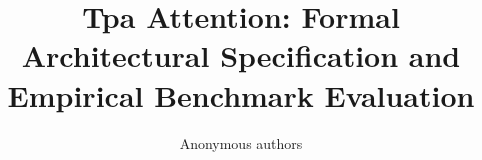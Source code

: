 \title{\textbf{Tpa Attention: Formal Architectural Specification and Empirical Benchmark Evaluation}}

\author{Anonymous authors}
